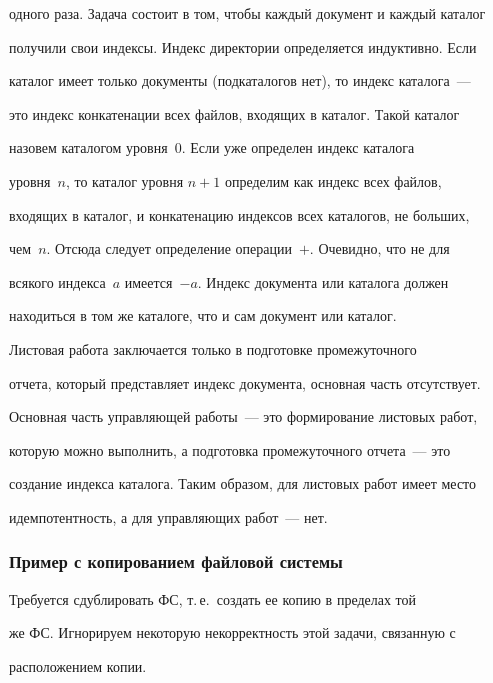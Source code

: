 одного раза. Задача состоит в том, чтобы каждый документ и каждый каталог 


получили свои индексы. Индекс директории определяется индуктивно. Если 


каталог имеет только документы (подкаталогов нет), то индекс каталога~--- 


это индекс конкатенации всех файлов, входящих в каталог. Такой каталог 


назовем каталогом уровня~0. Если уже определен индекс каталога 


уровня~$n$, то каталог уровня $n+1$ определим как индекс всех файлов, 


входящих в каталог, и конкатенацию индексов всех каталогов, не больших, 


чем~$n$. Отсюда следует определение операции~$+$. Очевидно, что не для 


всякого индекса~$a$ имеется~$-a$. Индекс документа или каталога должен 


находиться в том же каталоге, что и сам документ или каталог. 


      


      Листовая работа заключается только в подготовке промежуточного 


отчета, который представляет индекс документа, основная часть отсутствует. 


Основная часть управляющей работы~--- это формирование листовых работ, 


которую можно выполнить, а подготовка промежуточного отчета~--- это 


создание индекса каталога. Таким образом, для листовых работ имеет место 


идемпотентность, а для управляющих работ~--- нет.





\subsubsection{Пример с копированием файловой системы}


      


      Требуется сдублировать ФС, т.\,е.\ создать ее копию в пределах той 


же ФС. Игнорируем некоторую некорректность этой задачи, связанную с 


расположением копии. 



